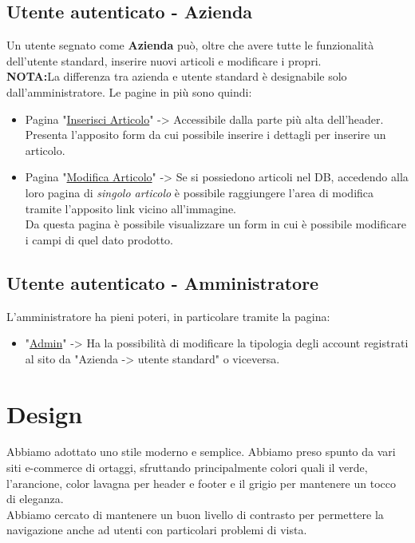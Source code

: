 \subsection{Utente autenticato - Azienda}
Un utente segnato come \textbf{Azienda} può, oltre che avere tutte le funzionalità dell'utente standard, inserire nuovi articoli e modificare i propri.\\ 
\textbf{NOTA:}La differenza tra azienda e utente standard è designabile solo dall'amministratore.
Le pagine in più sono quindi:
\begin{itemize}
	\item Pagina "\underline{Inserisci Articolo}" -> Accessibile dalla parte più alta dell'header.\\ Presenta l'apposito form da cui possibile inserire i dettagli per inserire un articolo.
	\item Pagina "\underline{Modifica Articolo}" -> Se si possiedono articoli nel DB, accedendo alla loro pagina di \textit{singolo articolo} è possibile raggiungere l'area di modifica tramite l'apposito link vicino all'immagine.\\
	Da questa pagina è possibile visualizzare un form in cui è possibile modificare i campi di quel dato prodotto.
\end{itemize}

\subsection{Utente autenticato - Amministratore}
L'amministratore ha pieni poteri, in particolare tramite la pagina:
\begin{itemize}
	\item "\underline{Admin}" -> Ha la possibilità di modificare la tipologia degli account registrati al sito da "Azienda -> utente standard" o viceversa.
\end{itemize}

\section{Design}
	Abbiamo adottato uno stile moderno e semplice. Abbiamo preso spunto da vari siti e-commerce di ortaggi, sfruttando principalmente colori quali il verde, l'arancione, color lavagna per header e footer e il grigio per mantenere un tocco di eleganza.\\ Abbiamo cercato di mantenere un buon livello di contrasto per permettere la navigazione anche ad utenti con particolari problemi di vista.

